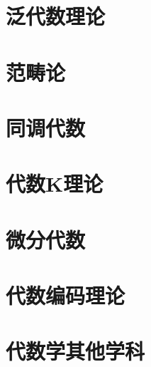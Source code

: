 \documentclass[UTF8]{../09-Mathematics}
\begin{document}
\chapter{泛代数理论}
\chapter{范畴论}
\chapter{同调代数}
\chapter{代数K理论}
\chapter{微分代数}
\chapter{代数编码理论}
\chapter{代数学其他学科}
\end{document}
